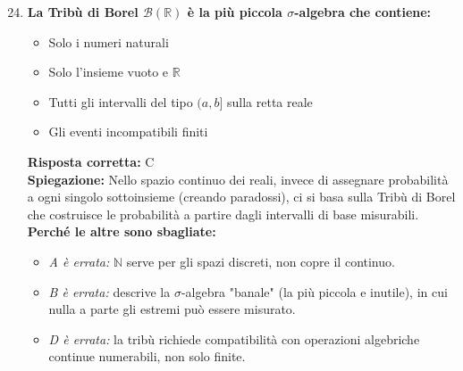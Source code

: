 \documentclass[12pt, a4paper]{article}
\begin{document}
\begin{enumerate}[label=\textbf{\arabic*.}]
\setcounter{enumi}{23}
    \item \textbf{La Tribù di Borel $\mathcal{B}(\mathbb{R})$ è la più piccola $\sigma$-algebra che contiene:}
    \begin{itemize}
        \item[A)] Solo i numeri naturali
        \item[B)] Solo l'insieme vuoto e $\mathbb{R}$
        \item[C)] Tutti gli intervalli del tipo $(a,b]$ sulla retta reale
        \item[D)] Gli eventi incompatibili finiti
    \end{itemize}
    \textbf{Risposta corretta:} C \\
    \textbf{Spiegazione:} Nello spazio continuo dei reali, invece di assegnare probabilità a ogni singolo sottoinsieme (creando paradossi), ci si basa sulla Tribù di Borel che costruisce le probabilità a partire dagli intervalli di base misurabili. \\
    \textbf{Perché le altre sono sbagliate:}
    \begin{itemize}
        \item \textit{A è errata:} $\mathbb{N}$ serve per gli spazi discreti, non copre il continuo.
        \item \textit{B è errata:} descrive la $\sigma$-algebra "banale" (la più piccola e inutile), in cui nulla a parte gli estremi può essere misurato.
        \item \textit{D è errata:} la tribù richiede compatibilità con operazioni algebriche continue numerabili, non solo finite.
    \end{itemize}


\end{enumerate}
\end{document}
